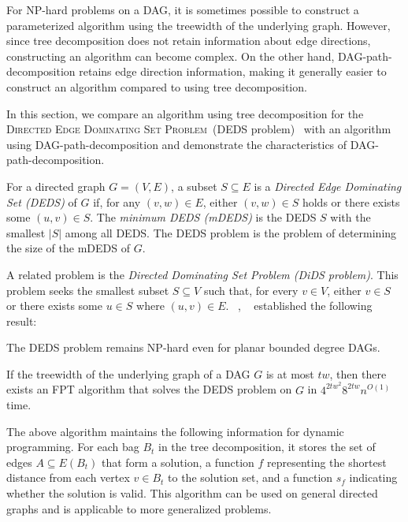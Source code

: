 \documentclass[runningheads]{llncs}
\theoremstyle{plain}
\theoremstyle{definition}
\begin{document}
For NP-hard problems on a DAG, it is sometimes possible to construct a parameterized algorithm using the treewidth of the underlying graph.  
However, since tree decomposition does not retain information about edge directions, constructing an algorithm can become complex.  
On the other hand, DAG-path-decomposition retains edge direction information, making it generally easier to construct an algorithm compared to using tree decomposition.  

In this section, we compare an algorithm using tree decomposition for the \textsc{Directed Edge Dominating Set Problem}~(DEDS problem)~\cite{art22} with an algorithm using DAG-path-decomposition and demonstrate the characteristics of DAG-path-decomposition.  

For a directed graph \(G = (V, E)\), a subset \(S \subseteq E\) is a \emph{Directed Edge Dominating Set (DEDS)} of \(G\) if, for any \((v, w) \in E\), either \((v, w) \in S\) holds or there exists some \((u, v) \in S\).  
The \emph{minimum DEDS (mDEDS)} is the DEDS \(S\) with the smallest \(|S|\) among all DEDS.  
The DEDS problem is the problem of determining the size of the mDEDS of \(G\).  

A related problem is the \emph{Directed Dominating Set Problem (DiDS problem)}.  
This problem seeks the smallest subset \(S \subseteq V\) such that, for every \(v \in V\), either \(v \in S\) or there exists some \(u \in S\) where \((u, v) \in E\).  
~\cite{art23}, ~\cite{art22} established the following result:  

\begin{proposition}
    The DEDS problem remains NP-hard even for planar bounded degree DAGs.
\end{proposition}

\begin{proposition}
    If the treewidth of the underlying graph of a DAG \(G\) is at most \(tw\), then there exists an FPT algorithm that solves the DEDS problem on \(G\) in \(4^{2tw^2} 8^{2tw} n^{O(1)}\) time.  
\end{proposition}

The above algorithm maintains the following information for dynamic programming. For each bag \(B_t\) in the tree decomposition, it stores the set of edges \(A \subseteq E(B_t)\) that form a solution, a function \(f\) representing the shortest distance from each vertex \(v \in B_t\) to the solution set, and a function \(s_f\) indicating whether the solution is valid.  
This algorithm can be used on general directed graphs and is applicable to more generalized problems.  
\end{document}
